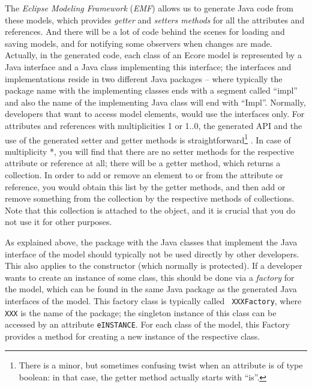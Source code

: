 %  
The \emph{Eclipse Modeling Framework} (\emph{EMF}) \cite{BSM06} allows us to
generate Java code from these models, which provides \emph{getter}%
and \emph{setters methods}%
for all the attributes and references. And there will be a lot of code behind
the scenes for loading and saving models, and for notifying some observers when
changes are made. Actually, in the generated code, each class of an Ecore model
is represented by a Java interface and a Java class implementing this interface;
the interfaces and implementations reside in two different Java packages --
where typically the package name with the implementing classes ends with a segment called ``impl'' and also
the name of the implementing Java class will end with ``Impl''. Normally, developers that want to access
model elements, would use the interfaces only. For attributes and references
with multiplicities 1 or 1..0, the generated API and the use of the generated
setter and getter methods is straightforward\footnote 
  {There is a minor, but sometimes confusing twist when an attribute is
   of type boolean: in that case, the getter method actually starts with
   ``is''.}%
.  In case of multiplicity *, you will find that there are no setter methods
for the respective attribute or reference at all; there will be a getter method,
which returns a collection. In order to add or remove an element to or from the
attribute or reference, you would obtain this list by the getter methods, and
then add or remove something from the collection by the respective methods of
collections. Note that this collection is attached to the object, and it is
crucial that you do not use it for other purposes.  

As explained above, the package with the Java classes that implement the
Java interface of the model should typically not be used directly by other
developers. This also applies to the constructor (which normally is protected).
If a developer wants to create an instance of some class, this should be
done via a \emph{factory}%
for the model, which can be found in the same Java package as the generated Java
interfaces of the model. This factory class is typically called {\tt
XXXFactory}, where  {\tt XXX} is the name of the package; the singleton
instance of this class can be accessed by an attribute {\tt eINSTANCE}.
For each class of the model, this Factory provides a method for creating
a new instance of the respective class.%


